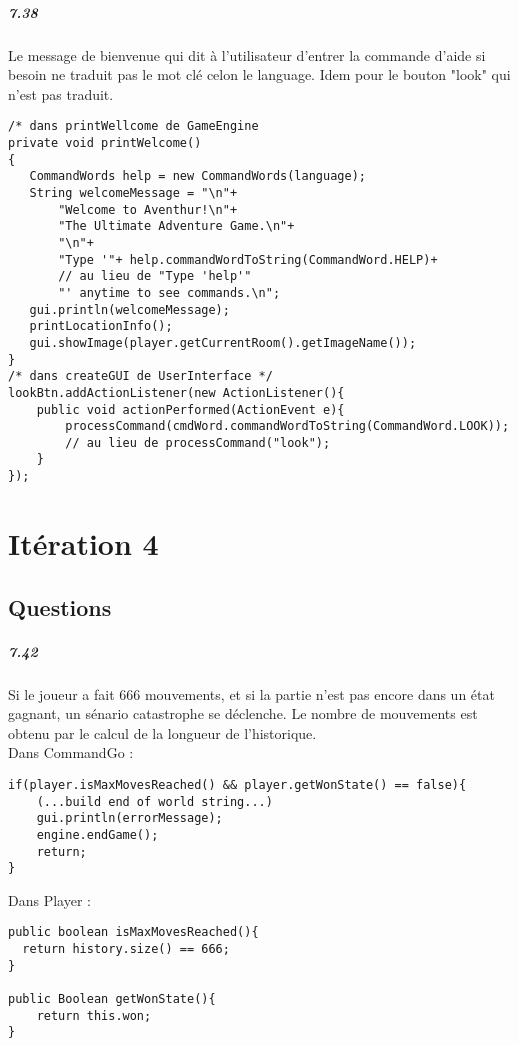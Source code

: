\documentclass[11pt,a4paper]{report}
\begin{document}
\paragraph{7.38}
Le message de bienvenue qui dit à l'utilisateur d'entrer la commande d'aide si besoin ne traduit pas le mot clé celon le language. Idem pour le bouton "look" qui n'est pas traduit.
\begin{lstlisting}
/* dans printWellcome de GameEngine
private void printWelcome()
{
   CommandWords help = new CommandWords(language);
   String welcomeMessage = "\n"+
       "Welcome to Aventhur!\n"+
       "The Ultimate Adventure Game.\n"+
       "\n"+
       "Type '"+ help.commandWordToString(CommandWord.HELP)+
       // au lieu de "Type 'help'"
       "' anytime to see commands.\n";
   gui.println(welcomeMessage);
   printLocationInfo();
   gui.showImage(player.getCurrentRoom().getImageName());
}
/* dans createGUI de UserInterface */
lookBtn.addActionListener(new ActionListener(){
    public void actionPerformed(ActionEvent e){
        processCommand(cmdWord.commandWordToString(CommandWord.LOOK));
        // au lieu de processCommand("look");
    }
});
\end{lstlisting}


\chapter{Itération 4}
\section{Questions}

\paragraph{7.42}
Si le joueur a fait 666 mouvements, et si la partie n'est pas encore dans un état gagnant, un sénario catastrophe se déclenche. Le nombre de mouvements est obtenu par le calcul de la longueur de l'historique. \\
Dans CommandGo :
\begin{lstlisting}
if(player.isMaxMovesReached() && player.getWonState() == false){
    (...build end of world string...)
    gui.println(errorMessage);
    engine.endGame();
    return;
}
\end{lstlisting}
Dans Player :\\
\begin{lstlisting}
public boolean isMaxMovesReached(){
  return history.size() == 666;
}

public Boolean getWonState(){
    return this.won;
}
\end{lstlisting}
\end{document}
